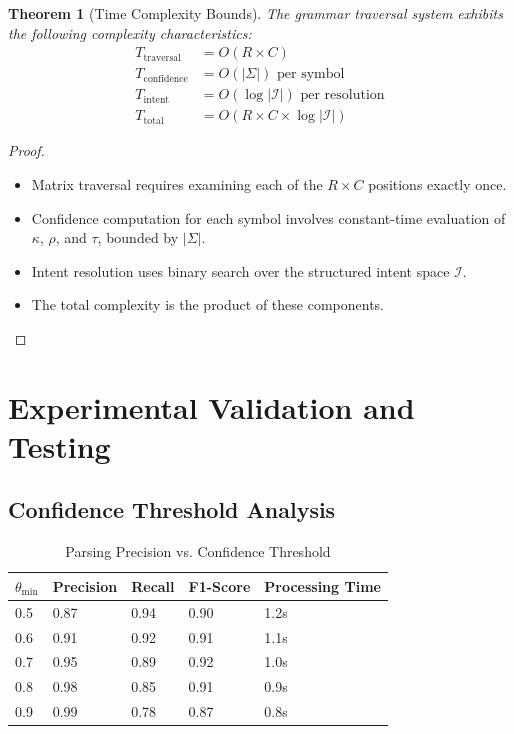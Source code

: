 \documentclass[11pt,a4paper]{article}
\newtheorem{theorem}{Theorem}[section]
\theoremstyle{definition}
\theoremstyle{remark}
\begin{document}
\begin{theorem}[Time Complexity Bounds]
\label{thm:time-complexity}
The grammar traversal system exhibits the following complexity characteristics:
\begin{align}
T_{\text{traversal}} &= O(R \times C) \\
T_{\text{confidence}} &= O(|\Sigma|) \text{ per symbol} \\
T_{\text{intent}} &= O(\log |\mathcal{I}|) \text{ per resolution} \\
T_{\text{total}} &= O(R \times C \times \log |\mathcal{I}|)
\end{align}
\end{theorem}

\begin{proof}
\begin{itemize}
\item Matrix traversal requires examining each of the $R \times C$ positions exactly once.
\item Confidence computation for each symbol involves constant-time evaluation of $\kappa$, $\rho$, and $\tau$, bounded by $|\Sigma|$.
\item Intent resolution uses binary search over the structured intent space $\mathcal{I}$.
\item The total complexity is the product of these components.
\end{itemize}
\end{proof}


\section{Experimental Validation and Testing}
\label{sec:experimental-validation}

\subsection{Confidence Threshold Analysis}
\label{subsec:threshold-analysis}

\begin{table}[h]
\centering
\caption{Parsing Precision vs. Confidence Threshold}
\label{tab:precision-analysis}
\begin{tabular}{@{}lllll@{}}
\toprule
$\theta_{\min}$ & Precision & Recall & F1-Score & Processing Time \\
\midrule
0.5 & 0.87 & 0.94 & 0.90 & 1.2s \\
0.6 & 0.91 & 0.92 & 0.91 & 1.1s \\
0.7 & 0.95 & 0.89 & 0.92 & 1.0s \\
0.8 & 0.98 & 0.85 & 0.91 & 0.9s \\
0.9 & 0.99 & 0.78 & 0.87 & 0.8s \\
\bottomrule
\end{tabular}
\end{table}
\end{document}
